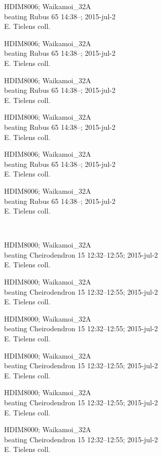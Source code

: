 \documentclass[2pt]{extarticle}
\begin{document}
\noindent
\parbox{0.16\textwidth}{\tiny \raggedright \rule[-0.3\baselineskip]{0pt}{10pt}HDIM8006; Waikamoi\_32A\\ beating Rubus 65 14:38--; 2015-jul-2\\ E. Tielens coll.}
\parbox{0.16\textwidth}{\tiny \raggedright \rule[-0.3\baselineskip]{0pt}{10pt}HDIM8006; Waikamoi\_32A\\ beating Rubus 65 14:38--; 2015-jul-2\\ E. Tielens coll.}
\parbox{0.16\textwidth}{\tiny \raggedright \rule[-0.3\baselineskip]{0pt}{10pt}HDIM8006; Waikamoi\_32A\\ beating Rubus 65 14:38--; 2015-jul-2\\ E. Tielens coll.}
\parbox{0.16\textwidth}{\tiny \raggedright \rule[-0.3\baselineskip]{0pt}{10pt}HDIM8006; Waikamoi\_32A\\ beating Rubus 65 14:38--; 2015-jul-2\\ E. Tielens coll.}
\parbox{0.16\textwidth}{\tiny \raggedright \rule[-0.3\baselineskip]{0pt}{10pt}HDIM8006; Waikamoi\_32A\\ beating Rubus 65 14:38--; 2015-jul-2\\ E. Tielens coll.}
\parbox{0.16\textwidth}{\tiny \raggedright \rule[-0.3\baselineskip]{0pt}{10pt}HDIM8006; Waikamoi\_32A\\ beating Rubus 65 14:38--; 2015-jul-2\\ E. Tielens coll.} \\ 
\vspace{0.001in} 

\noindent
\parbox{0.16\textwidth}{\tiny \raggedright \rule[-0.3\baselineskip]{0pt}{10pt}HDIM8000; Waikamoi\_32A\\ beating Cheirodendron 15 12:32--12:55; 2015-jul-2\\ E. Tielens coll.}
\parbox{0.16\textwidth}{\tiny \raggedright \rule[-0.3\baselineskip]{0pt}{10pt}HDIM8000; Waikamoi\_32A\\ beating Cheirodendron 15 12:32--12:55; 2015-jul-2\\ E. Tielens coll.}
\parbox{0.16\textwidth}{\tiny \raggedright \rule[-0.3\baselineskip]{0pt}{10pt}HDIM8000; Waikamoi\_32A\\ beating Cheirodendron 15 12:32--12:55; 2015-jul-2\\ E. Tielens coll.}
\parbox{0.16\textwidth}{\tiny \raggedright \rule[-0.3\baselineskip]{0pt}{10pt}HDIM8000; Waikamoi\_32A\\ beating Cheirodendron 15 12:32--12:55; 2015-jul-2\\ E. Tielens coll.}
\parbox{0.16\textwidth}{\tiny \raggedright \rule[-0.3\baselineskip]{0pt}{10pt}HDIM8000; Waikamoi\_32A\\ beating Cheirodendron 15 12:32--12:55; 2015-jul-2\\ E. Tielens coll.}
\parbox{0.16\textwidth}{\tiny \raggedright \rule[-0.3\baselineskip]{0pt}{10pt}HDIM8000; Waikamoi\_32A\\ beating Cheirodendron 15 12:32--12:55; 2015-jul-2\\ E. Tielens coll.} \\ 
\vspace{0.001in} 
\end{document}
